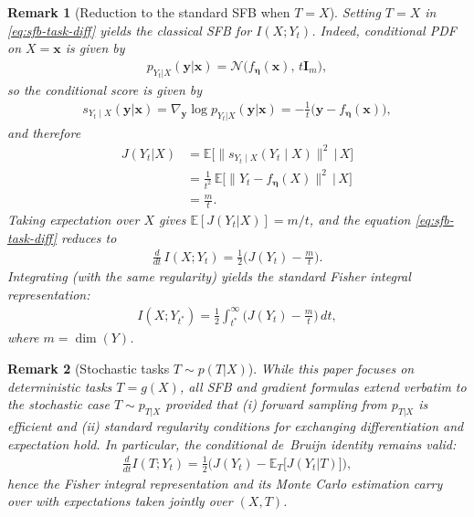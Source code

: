 \documentclass[conference]{IEEEtran}
\newtheorem{remark}{Remark}
\newcommand{\E}{\mathbb{E}}
\begin{document}
\begin{remark}[Reduction to the standard SFB when $T=X$] \rm
    \label{rem:sfb-reduction}
    Setting $T=X$ in \eqref{eq:sfb-task-diff} yields the classical SFB for $I(X;Y_t)$.
    Indeed, conditional PDF on $X=\bm x$ is given by
    \begin{align}
    p_{Y_t| X}(\bm y|\bm x) = \mathcal N\!\big(f_{\bm\eta}(\bm x),\, t \bm I_m\big),
    \end{align}
    so the conditional score is given by
    \begin{align}
    s_{Y_t\mid X}(\bm y|\bm x)=\nabla_{\bm y}\log p_{Y_t|X}(\bm y|\bm x)
    = -\frac{1}{t}\big(\bm y - f_{\bm\eta}(\bm x)\big),
    \end{align}
    and therefore
    \begin{align}
    J(Y_t|X)
    &=\E\!\big[\|s_{Y_t\mid X}(Y_t\mid X)\|^2\,\big|\,X\big] \\
    &=\frac{1}{t^2}\,\E\!\big[\|Y_t-f_{\bm\eta}(X)\|^2 \,\big|\, X\big] \\
    &=\frac{m}{t}.
    \end{align}
    Taking expectation over $X$ gives $\E[J(Y_t| X)]=m/t$, and
    the equation \eqref{eq:sfb-task-diff} reduces to
    \begin{align}
    \frac{d}{dt}\,I(X;Y_t)
    =\frac12\Big(J(Y_t)-\frac{m}{t}\Big).
    \end{align}
    Integrating (with the same regularity) yields the standard Fisher integral representation:
    \begin{align}
    I(X;Y_{t^*})
    =\frac12\int_{t^*}^{\infty}\!\Big(J(Y_t)-\frac{m}{t}\Big)\,dt,
    \end{align}
    where $m=\dim(Y)$.
\end{remark}
   
\begin{remark}[Stochastic tasks $T\!\sim\! p(T|X)$] \rm 
    \label{rem:stochastic_T}
    While this paper focuses on deterministic tasks $T=g(X)$, all SFB and gradient 
    formulas extend verbatim to the stochastic case $T\!\sim\!p_{T|X}$ provided that 
    (i) forward sampling from $p_{T|X}$ is efficient and 
    (ii) standard regularity conditions for exchanging differentiation and expectation hold. 
    In particular, the conditional de~Bruijn identity remains valid:
    \begin{align}
    \frac{d}{dt}I(T;Y_t) = \frac12\Big(J(Y_t)-\E_{T}\big[J(Y_t| T)\big]\Big),
    \end{align}
    hence the Fisher integral representation and its Monte Carlo estimation 
    carry over with expectations taken jointly over $(X,T)$.
\end{remark}
   
\end{document}

